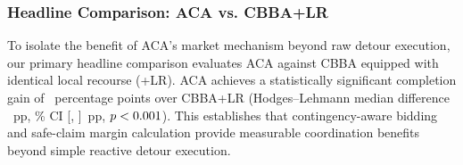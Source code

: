 \documentclass[lettersize,journal]{IEEEtran}
\begin{document}
\subsubsection{Headline Comparison: ACA vs. CBBA+LR}
To isolate the benefit of ACA's market mechanism beyond raw detour execution, our primary headline comparison evaluates ACA against CBBA equipped with identical local recourse (+LR). ACA achieves a statistically significant completion gain of \aeHtwoCbbaLrDiff\ percentage points over CBBA+LR (Hodges--Lehmann median difference \aeHtwoCbbaLrHlMedian~pp, \aeConfidenceLevel\% CI [\aeHtwoCbbaLrCILow, \aeHtwoCbbaLrCIHigh]~pp, $p < 0.001$). This establishes that contingency-aware bidding and safe-claim margin calculation provide measurable coordination benefits beyond simple reactive detour execution.


\end{document}
